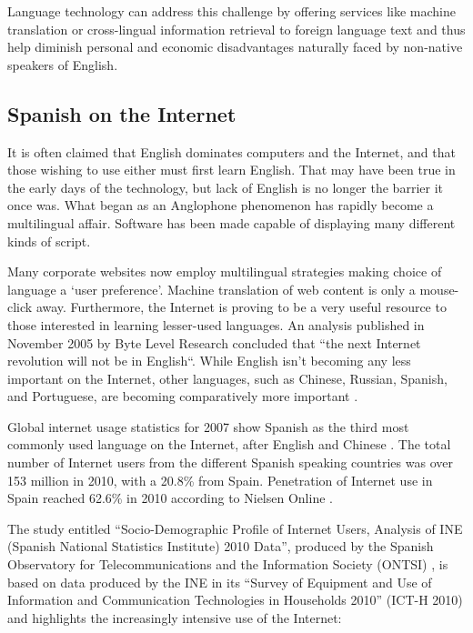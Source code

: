 \begin{multicols}{2}
Language technology can address this challenge by offering services like machine translation or cross-lingual information retrieval to foreign language text and thus help diminish personal and economic disadvantages naturally faced by non-native speakers of English.


\subsection{Spanish on the Internet}

It is often claimed that English dominates computers and the Internet, and that those wishing to use either must first learn English. That may have been true in the early days of the technology, but lack of English is no longer the barrier it once was. What began as an Anglophone phenomenon has rapidly become a multilingual affair. Software has been made capable of displaying many different kinds of script. \cite{espanolred}


Many corporate websites now employ multilingual strategies making choice of language a ‘user preference’. Machine translation of web content is only a mouse-click away. Furthermore, the Internet is proving to be a very useful resource to those interested in learning lesser-used languages. An analysis published in November 2005 by Byte Level Research concluded that “the next Internet revolution will not be in English“. While English isn’t becoming any less important on the Internet, other languages, such as Chinese, Russian, Spanish, and Portuguese, are becoming comparatively more important \cite{britishcouncil}.


Global internet usage statistics for 2007 show Spanish as the third most commonly used language on the Internet, after English and Chinese \cite{internetworldstats}. The total number of Internet users from the different Spanish speaking countries was over 153 million in 2010, with a 20.8\% from Spain. Penetration of Internet use in Spain reached 62.6\% in 2010 according to Nielsen Online \cite{nielsen}.

The study entitled “Socio-Demographic Profile of Internet Users, Analysis of INE (Spanish National Statistics Institute) 2010 Data”, produced by the Spanish Observatory for Telecommunications and the Information Society (ONTSI) \cite{ontsi}, is based on data produced by the INE in its “Survey of Equipment and Use of Information and Communication Technologies in Households 2010” (ICT-H 2010) and highlights the increasingly intensive use of the Internet:


\end{multicols}
